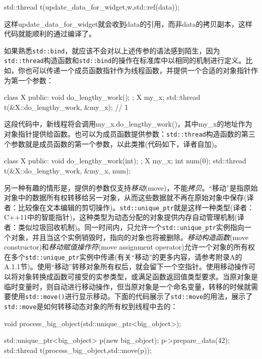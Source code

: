 \begin{cpp}
std::thread t(update_data_for_widget,w,std::ref(data));
\end{cpp}

这样update\_data\_for\_widget就会收到data的引用，而非data的拷贝副本，这样代码就能顺利的通过编译了。

如果熟悉\texttt{std::bind}，就应该不会对以上述传参的语法感到陌生，因为\texttt{std::thread}构造函数和\texttt{std::bind}的操作在标准库中以相同的机制进行定义。比如，你也可以传递一个成员函数指针作为线程函数，并提供一个合适的对象指针作为第一个参数：

\begin{cpp}
class X
{
public:
  void do_lengthy_work();
};
X my_x;
std::thread t(&X::do_lengthy_work, &my_x); // 1
\end{cpp}

这段代码中，新线程将会调用my\_x.do\_lengthy\_work()，其中my\_x的地址作为对象指针提供给函数。也可以为成员函数提供参数：\texttt{std::thread}构造函数的第三个参数就是成员函数的第一个参数，以此类推(代码如下，译者自加)。

\begin{cpp}
class X
{
public:
  void do_lengthy_work(int);
};
X my_x;
int num(0);
std::thread t(&X::do_lengthy_work, &my_x, num);
\end{cpp}

另一种有趣的情形是，提供的参数仅支持\textit{移动}(move)，不能\textit{拷贝}。“移动”是指原始对象中的数据所有权转移给另一对象，从而这些数据就不再在原始对象中保存(译者：比较像在文本编辑的剪切操作)。\texttt{std::unique\_ptr}就是这样一种类型(译者：C++11中的智能指针)，这种类型为动态分配的对象提供内存自动管理机制(译者：类似垃圾回收机制)。同一时间内，只允许一个\texttt{std::unique\_ptr}实例指向一个对象，并且当这个实例销毁时，指向的对象也将被删除。\textit{移动构造函数}(move constructor)和\textit{移动赋值操作符}(move assignment operator)允许一个对象的所有权在多个\texttt{std::unique\_ptr}实例中传递(有关“移动”的更多内容，请参考附录A的A.1.1节)。使用“移动”转移对象所有权后，就会留下一个空指针。使用移动操作可以将对象转换成函数可接受的实参类型，或满足函数返回值类型要求。当原对象是临时变量时，则自动进行移动操作，但当原对象是一个命名变量，转移的时候就需要使用\texttt{std::move()}进行显示移动。下面的代码展示了\texttt{std::move}的用法，展示了\texttt{std::move}是如何转移动态对象的所有权到线程中去的：

\begin{cpp}
void process_big_object(std::unique_ptr<big_object>);

std::unique_ptr<big_object> p(new big_object);
p->prepare_data(42);
std::thread t(process_big_object,std::move(p));
\end{cpp}

